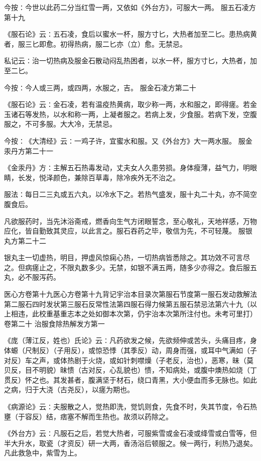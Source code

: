 \documentclass[a4paper,12pt,UTF8,twoside]{ctexbook}
\begin{document}
今按∶今世以此药二分当红雪一两，又依如《外台方》，可服大一两。
服五石凌方第十九

《服石论》云∶五石凌，食后以蜜水一杯，服方寸匕，大热者加至二匕。患热病黄者，服三匕即愈。初得热病，服二匕亦（立）愈。无禁忌。

私记云∶治一切热病及服金石散动闷乱热困者，以水一杯，服方寸匕，大热者，加至二匕。

今按∶今人或三两，或四两，水服之，吉。
服金石凌方第二十

《服石论》云∶金石凌，若有温疫热黄病，取少称一两，水和服之，即得瘥。若金玉诸石等发热，以水和称一两，上凝者服之。若病上发，少食服。若病下发，空腹服之，不可多服。大大冷，无禁忌。

今按∶《大清经》云∶一鸡子许，宜蜜水和服。又《外台方》大一两水服。
服金汞丹方第二十一

《金汞丹》方∶主解五石热毒发动，丈夫女人久患劳损。身体瘦薄，益气力，明眼睛，长发，悦泽颜色，兼除百草毒，除冷疾外无不治之。

服法∶每日二三丸或五六丸，以冷水下之。若热气盛发，服十丸二十丸，亦不简空腹食后。

凡欲服药时，当先沐浴斋戒，燃香向生气方闭眼誓念，至心敬礼，天地祥感，万物应化，皆自勤致其灵应，以此言之。服石吞药之毕，敬信为先，不可轻蔑。
服银丸方第二十二

银丸主一切虚热，明目，押虚风惊痫心热，一切热病皆悉除之。其功效不可言尽之。但病瘥止之，不限丸数多少。无禁，如银不满五两，随多少亦得之。食后服五丸，必不服泻药。

医心方卷第十九医心方卷第十九背记宇治本目录次第服石节度第一服石发动救解法第二服石四时发状第三服石反常性法第四服石得力候第五服石禁忌法第六十九（以上相违，此校重基重志本之处如御本次第，仍宇治本次第所注付也。未考可里打）
卷第二十
治服食除热解发方第一

《庞（薄江反，姓也）氏论》云∶凡药欲发之候，先欲频伸或苦头，头痛目疼，身体螈（尺制反）（子用反），或惊恐悸（其季反）动，周身而强，或耳中气满如（子对反）车之声，或体热剧于火烧，或如针刺噤燥（子老反，治也），恶寒，昧（莫贝反，目不明貌）昧愦（古对反，心乱貌也）愦，不知病处，或腹中燠热如烧（丁贯反）怀之也。其发甚者，腹满坚于材石，绕口青黑，大小便血而多无脉也。如此之病，归于大浇（古尧反），以瘥为期也。

《病源论》云∶夫服散之人，觉热即洗，觉饥则食，先食不时，失其节度，令石热壅（于容反）结，痞塞不解而生热也。故须以药除之。

《外台方》云∶凡服石之后，若觉大热者，可服紫雪或金石凌或绛雪或白雪等，但半大升水，取瓷（才资反）研一大两，香汤浴后顿服之。候一两行，利热乃退矣。凡此救急中，紫雪为上。
\end{document}
